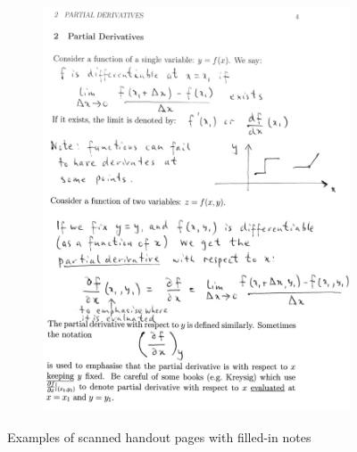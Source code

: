 \begin{figure}[!htb]
\begin{subfigure}{.52\textwidth}
        \includegraphics[width=\textwidth]{handout2.jpg}
    \end{subfigure}
    \caption{Examples of scanned handout pages with filled-in notes}
    \label{fig:intro-example-handouts}
\end{figure}

